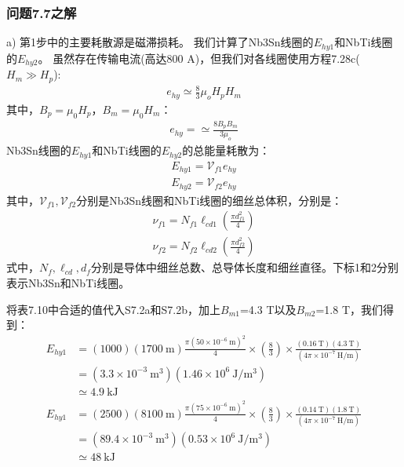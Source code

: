 \subsubsection{问题7.7之解}
a) 第1步中的主要耗散源是磁滞损耗。 
我们计算了Nb3Sn线圈的$E_{hy1}$和NbTi线圈的$E_{hy2}$。
 虽然存在传输电流(高达800 A)，但我们对各线圈使用方程7.28c($H_m\gg H_p$):
\begin{align*}%
e_{hy}\simeq\frac{8}{3}\mu_oH_pH_m \tag{7.28c}
\end{align*}
其中，$B_p=\mu_0 H_p$，$B_m=\mu_0 H_m$：
\begin{align*}
e_{hy}=\simeq\frac{8B_pB_m}{3\mu_o} \tag{S7.1}
\end{align*}
Nb3Sn线圈的$E_{hy1}$和NbTi线圈的$E_{hy2}$的总能量耗散为：
\begin{align*}%
E_{hy1}=\mathcal{V}_{f1}e_{hy} \tag{S7.1a}
\end{align*}
\begin{align*}%
E_{hy2}=\mathcal{V}_{f2}e_{hy} \tag{S71.b}
\end{align*}
其中，$\mathcal{V}_{f1},\mathcal{V}_{f2}$分别是Nb3Sn线圈和NbTi线圈的细丝总体积，分别是：
\begin{align*}%
\nu_{f1}=N_{f1}\ell_{cd1}\left(\frac{\pi d_{f1}^{2}}{4}\right) \tag{S7.2a}
\end{align*}
\begin{align*}%
\nu_{f2}=N_{f2}\ell_{cd2}\left(\frac{\pi d_{f2}^{2}}{4}\right) \tag{S7.2b}
\end{align*}
式中，$N_f,\ell_{cd},d_f$分别是导体中细丝总数、总导体长度和细丝直径。下标1和2分别表示Nb3Sn和NbTi线圈。

将表7.10中合适的值代入S7.2a和S7.2b，加上$B_{m1}$=4.3 T以及$B_{m2}$=1.8 T，我们得到：
\begin{align*}%
E_{hy1}&=(1000)(1700\ \mathrm{m})\frac{\pi(50\times 10^{-6}\ \mathrm{m})^2}{4} 
\times\left(\frac{8}{3}\right)\times\frac{(0.16\ \mathrm{T})(4.3\ \mathrm{T})}{(4\pi\times 10^{-7}\ \mathrm{H/m})} \\
&=(3.3\times 10^{-3}\ \mathrm{m^3})(1.46\times 10^6\ \mathrm{J/m^3})\\ \tag{S7.3a}
&\simeq 4.9\ \mathrm{kJ}
\end{align*}
\begin{align*}%
E_{hy1}&=(2500)(8100\ \mathrm{m})\frac{\pi(75\times 10^{-6}\ \mathrm{m})^2}{4} 
\times\left(\frac{8}{3}\right)\times\frac{(0.14\ \mathrm{T})(1.8\ \mathrm{T})}{(4\pi\times 10^{-7}\ \mathrm{H/m})} \\
&=(89.4\times 10^{-3}\ \mathrm{m^3})(0.53\times 10^6\ \mathrm{J/m^3})\\ \tag{S7.3b}
&\simeq 48\ \mathrm{kJ}
\end{align*}

